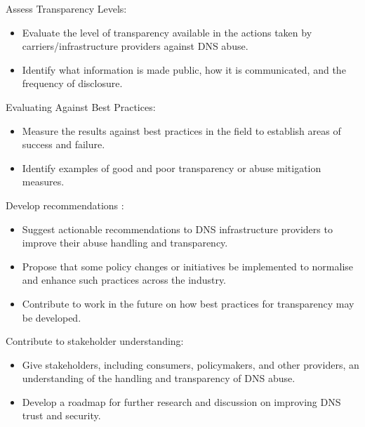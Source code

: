 Assess Transparency Levels:

\begin{itemize}
  \item Evaluate the level of transparency available in the actions taken by carriers/infrastructure providers against DNS abuse.
  \item Identify what information is made public, how it is communicated, and the frequency of disclosure.
\end{itemize}

Evaluating Against Best Practices:

\begin{itemize}
  \item Measure the results against best practices in the field to establish areas of success and failure. 
  \item Identify examples of good and poor transparency or abuse mitigation measures.
\end{itemize}

Develop recommendations :

\begin{itemize}
  \item Suggest actionable recommendations to DNS infrastructure providers to improve their abuse handling and transparency.
  \item Propose that some policy changes or initiatives be implemented to normalise and enhance such practices across the industry.
  \item Contribute to work in the future on how best practices for transparency may be developed.
\end{itemize}

Contribute to stakeholder understanding: 

\begin{itemize}
  \item Give stakeholders, including consumers, policymakers, and other providers, an understanding of the handling and transparency of DNS abuse.
  \item Develop a roadmap for further research and discussion on improving DNS trust and security.
\end{itemize}

